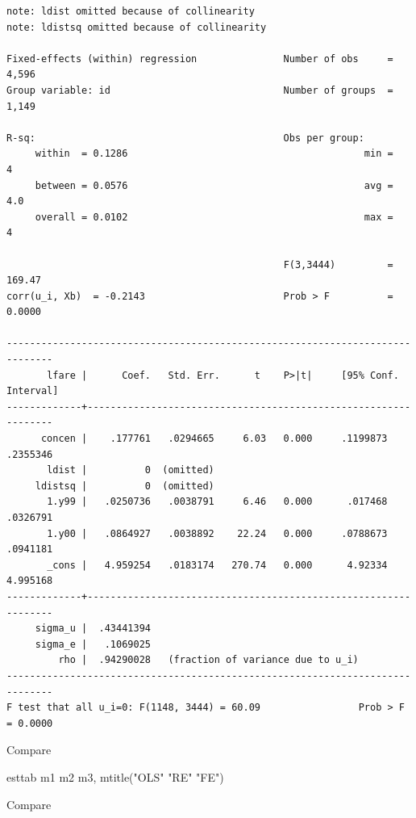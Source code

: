 \documentclass[
]{book}
\newenvironment{Shaded}{\begin{snugshade}}{\end{snugshade}}
\newcommand{\NormalTok}[1]{#1}
\newcommand{\StringTok}[1]{\textcolor[rgb]{0.31,0.60,0.02}{#1}}
\begin{document}
\begin{verbatim}
note: ldist omitted because of collinearity
note: ldistsq omitted because of collinearity

Fixed-effects (within) regression               Number of obs     =      4,596
Group variable: id                              Number of groups  =      1,149

R-sq:                                           Obs per group:
     within  = 0.1286                                         min =          4
     between = 0.0576                                         avg =        4.0
     overall = 0.0102                                         max =          4

                                                F(3,3444)         =     169.47
corr(u_i, Xb)  = -0.2143                        Prob > F          =     0.0000

------------------------------------------------------------------------------
       lfare |      Coef.   Std. Err.      t    P>|t|     [95% Conf. Interval]
-------------+----------------------------------------------------------------
      concen |    .177761   .0294665     6.03   0.000     .1199873    .2355346
       ldist |          0  (omitted)
     ldistsq |          0  (omitted)
       1.y99 |   .0250736   .0038791     6.46   0.000      .017468    .0326791
       1.y00 |   .0864927   .0038892    22.24   0.000     .0788673    .0941181
       _cons |   4.959254   .0183174   270.74   0.000      4.92334    4.995168
-------------+----------------------------------------------------------------
     sigma_u |  .43441394
     sigma_e |   .1069025
         rho |  .94290028   (fraction of variance due to u_i)
------------------------------------------------------------------------------
F test that all u_i=0: F(1148, 3444) = 60.09                 Prob > F = 0.0000
\end{verbatim}

Compare

\begin{Shaded}
\begin{Highlighting}[]
\NormalTok{esttab m1 m2 m3, mtitle(}\StringTok{"OLS"} \StringTok{"RE"} \StringTok{"FE"}\NormalTok{)}
\end{Highlighting}
\end{Shaded}

Compare
\end{document}
